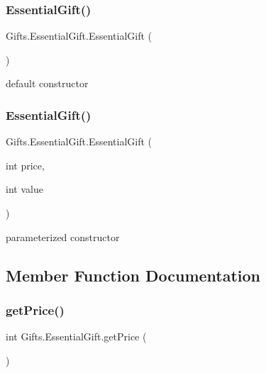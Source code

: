\subsubsection{\texorpdfstring{Essential\+Gift()}{EssentialGift()}\hspace{0.1cm}{\footnotesize\ttfamily [1/2]}}
{\footnotesize\ttfamily Gifts.\+Essential\+Gift.\+Essential\+Gift (\begin{DoxyParamCaption}{ }\end{DoxyParamCaption})\hspace{0.3cm}{\ttfamily [inline]}}

default constructor \mbox{\label{class_gifts_1_1_essential_gift_a9a98d0ea91a1cf3d90682a0120e0b350}} 
\subsubsection{\texorpdfstring{Essential\+Gift()}{EssentialGift()}\hspace{0.1cm}{\footnotesize\ttfamily [2/2]}}
{\footnotesize\ttfamily Gifts.\+Essential\+Gift.\+Essential\+Gift (\begin{DoxyParamCaption}\item[{int}]{price,  }\item[{int}]{value }\end{DoxyParamCaption})\hspace{0.3cm}{\ttfamily [inline]}}

parameterized constructor 

\subsection{Member Function Documentation}
\mbox{\label{class_gifts_1_1_essential_gift_a77b6e64a87945412d70fa9f6f24a8967}} 
\subsubsection{\texorpdfstring{get\+Price()}{getPrice()}}
{\footnotesize\ttfamily int Gifts.\+Essential\+Gift.\+get\+Price (\begin{DoxyParamCaption}{ }\end{DoxyParamCaption})\hspace{0.3cm}{\ttfamily [inline]}}

